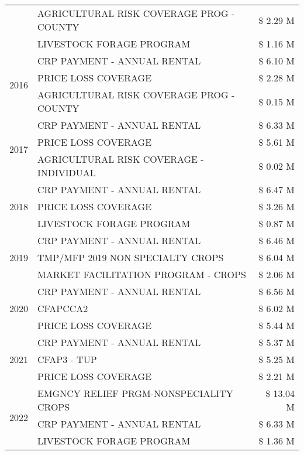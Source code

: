 \begin{tabular}{llr}
 & AGRICULTURAL RISK COVERAGE PROG - COUNTY & \$ 2.29 M \\
 & LIVESTOCK FORAGE PROGRAM & \$ 1.16 M \\
\cline{1-3}
\multirow[t]{3}{*}{2016} & CRP PAYMENT - ANNUAL RENTAL & \$ 6.10 M \\
 & PRICE LOSS COVERAGE & \$ 2.28 M \\
 & AGRICULTURAL RISK COVERAGE PROG - COUNTY & \$ 0.15 M \\
\cline{1-3}
\multirow[t]{3}{*}{2017} & CRP PAYMENT - ANNUAL RENTAL & \$ 6.33 M \\
 & PRICE LOSS COVERAGE & \$ 5.61 M \\
 & AGRICULTURAL RISK COVERAGE - INDIVIDUAL & \$ 0.02 M \\
\cline{1-3}
\multirow[t]{3}{*}{2018} & CRP PAYMENT - ANNUAL RENTAL & \$ 6.47 M \\
 & PRICE LOSS COVERAGE & \$ 3.26 M \\
 & LIVESTOCK FORAGE PROGRAM & \$ 0.87 M \\
\cline{1-3}
\multirow[t]{3}{*}{2019} & CRP PAYMENT - ANNUAL RENTAL & \$ 6.46 M \\
 & TMP/MFP 2019 NON SPECIALTY CROPS & \$ 6.04 M \\
 & MARKET FACILITATION PROGRAM - CROPS & \$ 2.06 M \\
\cline{1-3}
\multirow[t]{3}{*}{2020} & CRP PAYMENT - ANNUAL RENTAL & \$ 6.56 M \\
 & CFAPCCA2 & \$ 6.02 M \\
 & PRICE LOSS COVERAGE & \$ 5.44 M \\
\cline{1-3}
\multirow[t]{3}{*}{2021} & CRP PAYMENT - ANNUAL RENTAL & \$ 5.37 M \\
 & CFAP3 - TUP & \$ 5.25 M \\
 & PRICE LOSS COVERAGE & \$ 2.21 M \\
\cline{1-3}
\multirow[t]{3}{*}{2022} & EMGNCY RELIEF PRGM-NONSPECIALITY CROPS & \$ 13.04 M \\
 & CRP PAYMENT - ANNUAL RENTAL & \$ 6.33 M \\
 & LIVESTOCK FORAGE PROGRAM & \$ 1.36 M \\
\cline{1-3}
\bottomrule
\end{tabular}
